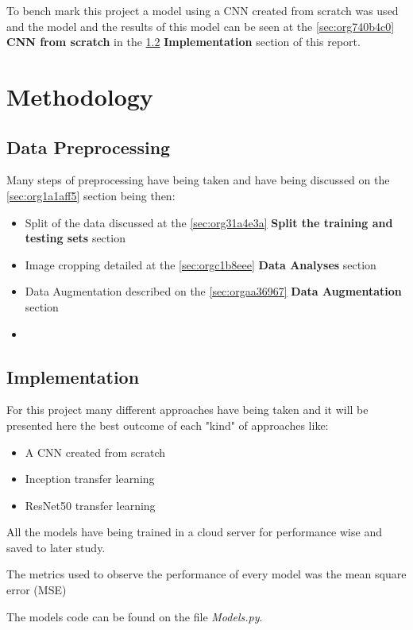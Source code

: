 \documentclass[11pt]{article}
\begin{document}
To bench mark this project a model using a CNN created from scratch was used 
and the model and the results of this model can be seen at the \ref{sec:org740b4c0} \textbf{CNN from scratch} in the \ref{sec:org926b49b} \textbf{Implementation} section of
this report.  


\section{Methodology}
\label{sec:org401bc18}

\subsection{Data Preprocessing}
\label{sec:org809a764}

Many steps of preprocessing have being taken and have being discussed on the
\ref{sec:org1a1aff5} section being then:
\begin{itemize}
\item Split of the data discussed at the \ref{sec:org31a4e3a}
\textbf{Split the training and testing sets} section
\item Image cropping detailed at the \ref{sec:orgc1b8eee} \textbf{Data Analyses} section
\item Data Augmentation described on the \ref{sec:orgaa36967} \textbf{Data Augmentation} section
\item 
\end{itemize}
\subsection{Implementation}
\label{sec:org926b49b}

For this project many different approaches have being taken and it will be
presented here the best outcome of each "kind" of approaches like:

\begin{itemize}
\item A CNN created from scratch
\item Inception transfer learning
\item ResNet50 transfer learning
\end{itemize}

All the models have being trained in a cloud server for performance wise and
saved to later study.

The metrics used to observe the performance of every model was the mean square
error (MSE)

The models code can be found on the file \emph{Models.py}.
\end{document}
